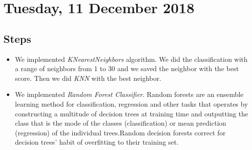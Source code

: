 \section{Tuesday, 11 December 2018}

\subsection{Steps}
\begin{itemize}

	\item We implemented \textit{KNearestNeighbors} algorithm. We did the classification with a range of neighbors from 1 to 30 and we saved the neighbor with the best score. Then we did \textit{KNN} with the best neighbor.
	
	\item We implemented \textit{Random Forest Classifier}. Random forests are an ensemble learning method for classification, regression and other tasks that operates by constructing a multitude of decision trees at training time and outputting the class that is the mode of the classes (classification) or mean prediction (regression) of the individual trees.Random decision forests correct for decision trees' habit of overfitting to their training set.
	
\end{itemize}
